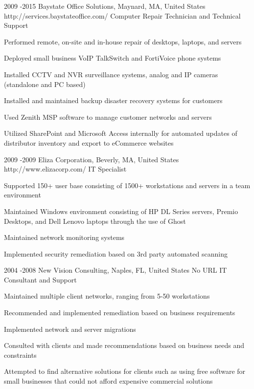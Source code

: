 \documentclass[10pt]{article} %
\begin{document}
\newpage
\job
{2009 -}{2015}
{Baystate Office Solutions, Maynard, MA, United States}
{http://services.baystateoffice.com/}
{Computer Repair Technician and Technical Support}
{\begin{itemize-noindent}
\item{Performed remote, on-site and in-house repair of desktops, laptops, and servers}
\item{Deployed small business VoIP TalkSwitch and FortiVoice phone systems}
\item{Installed CCTV and NVR surveillance systems, analog and IP cameras (standalone and PC based)}
\item{Installed and maintained backup disaster recovery systems for customers}
\item{Used Zenith MSP software to manage customer networks and servers}
\item{Utilized SharePoint and Microsoft Access internally for automated updates of distributor inventory and export to eCommerce websites}
\end{itemize-noindent}}


\job
{2009 -}{2009}
{Eliza Corporation, Beverly, MA, United States}
{http://www.elizacorp.com/}
{IT Specialist}
{\begin{itemize-noindent}
\item{Supported 150+ user base consisting of 1500+ workstations and servers in a team environment}
\item{Maintained Windows environment consisting of HP DL Series servers, Premio Desktops, and Dell Lenovo laptops through the use of Ghost}
\item{Maintained network monitoring systems}
\item{Implemented security remediation based on 3rd party automated scanning}
\end{itemize-noindent}}


\job
{2004 -}{2008}
{New Vision Consulting, Naples, FL, United States}
{No URL}
{IT Consultant and Support}
{\begin{itemize-noindent}
\item{Maintained multiple client networks, ranging from 5-50 workstations}
\item{Recommended and implemented remediation based on business requirements}
\item{Implemented network and server migrations}
\item{Consulted with clients and made recommendations based on business needs and constraints}
\item{Attempted to find alternative solutions for clients such as using free software for small businesses that could not afford expensive commercial solutions}
\end{itemize-noindent}}
\end{document}
